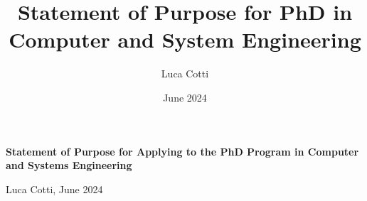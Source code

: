 \documentclass[a4paper,10pt]{article} %
\title{Statement of Purpose for PhD in Computer and System Engineering}
\author{Luca Cotti}
\date{June 2024}
\begin{document}

\begin{titlepage}
    \begin{center}
        \Large{\textbf{Statement of Purpose for Applying to the PhD Program in Computer and Systems Engineering}}\\

        \vspace{4mm}
    
        \normalsize{Luca Cotti, June 2024}\\
    \end{center}
\end{titlepage}


\end{document}
